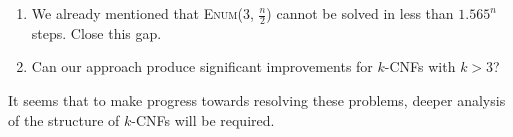 \documentclass[10pt,a4paper]{article}
\newcommand\enumballsat[2]{\textsc{Enum($#1$, $#2$)}}
\begin{document}
\begin{enumerate}
	\item We already mentioned that \enumballsat{3}{\frac{n}{2}} cannot be solved in less than $1.565^n$ steps. Close this gap.


	\item Can our approach produce significant improvements for $k$-CNFs with $k>3$?

\end{enumerate}

It seems that to make progress towards resolving these problems, deeper analysis of the structure of $k$-CNFs will be required. 
\end{document}
